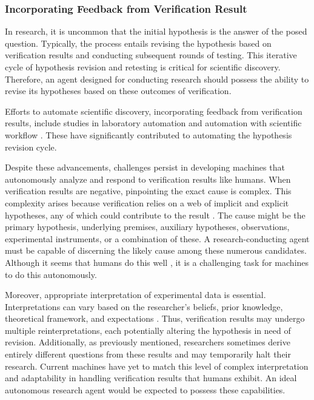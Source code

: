 
\subsubsection{Incorporating Feedback from Verification Result}

In research, it is uncommon that the initial hypothesis is the answer of the posed question. Typically, the process entails revising the hypothesis based on verification results and conducting subsequent rounds of testing. This iterative cycle of hypothesis revision and retesting is critical for scientific discovery. Therefore, an agent designed for conducting research should possess the ability to revise its hypotheses based on these outcomes of verification.

Efforts to automate scientific discovery, incorporating feedback from verification results, include studies in laboratory automation \cite{king2004functional} and automation with scientific workflow \cite{gil2022will}. These have significantly contributed to automating the hypothesis revision cycle.

Despite these advancements, challenges persist in developing machines that autonomously analyze and respond to verification results like humans. When verification results are negative, pinpointing the exact cause is complex. This complexity arises because verification relies on a web of implicit and explicit hypotheses, any of which could contribute to the result \cite{sep-scientific-underdetermination}. The cause might be the primary hypothesis, underlying premises, auxiliary hypotheses, observations, experimental instruments, or a combination of these. A research-conducting agent must be capable of discerning the likely cause among these numerous candidates. Although it seems that humans do this well \cite{ren2023autonomous}, it is a challenging task for machines to do this autonomously.

Moreover, appropriate interpretation of experimental data is essential. Interpretations can vary based on the researcher's beliefs, prior knowledge, theoretical framework, and expectations \cite{hanson1965patterns}. Thus, verification results may undergo multiple reinterpretations, each potentially altering the hypothesis in need of revision. Additionally, as previously mentioned, researchers sometimes derive entirely different questions from these results and may temporarily halt their research. Current machines have yet to match this level of complex interpretation and adaptability in handling verification results that humans exhibit. An ideal autonomous research agent would be expected to possess these capabilities.


